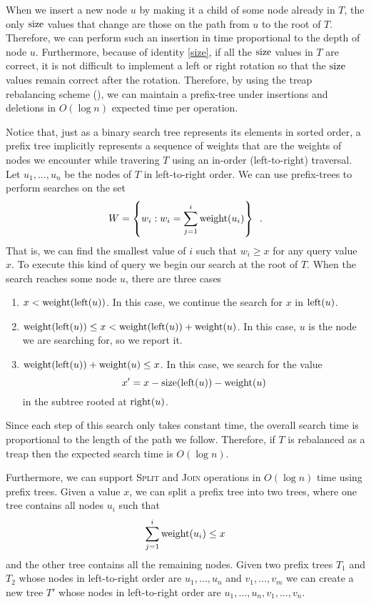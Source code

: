 When we insert a new node $u$ by making it a child of some node
already in $T$, the only $\mathrm{size}$ values that change are those on the
path from $u$ to the root of $T$.  Therefore, we can perform such an
insertion in time proportional to the depth of node $u$.  Furthermore,
because of identity \eqref{size}, if all the $\mathrm{size}$ values in $T$ are
correct, it is not difficult to implement a left or right rotation so
that the $\mathrm{size}$ values remain correct after the rotation.  Therefore, by
using the treap rebalancing scheme (), we can maintain
a prefix-tree under insertions and deletions in $O(\log n)$ expected
time per operation.

Notice that, just as a binary search tree represents its elements in
sorted order, a prefix tree implicitly represents a sequence of
weights that are the weights of nodes we encounter while travering $T$
using an in-order (left-to-right) traversal.  Let $u_1,\ldots,u_n$ be
the nodes of $T$ in left-to-right order.  We can use prefix-trees to
perform searches on the set 
\[
W = \left\{ w_i : w_i = \sum_{j=1}^i \mathrm{weight}(u_i) \right\} \enspace .
\]
That is, we can find the smallest value of $i$ such that $w_i\ge x$
for any query value $x$.  To execute this kind of query we begin our
search at the root of $T$.  When the search reaches some node $u$,
there are three cases

\begin{enumerate}
\item $x < \mathrm{weight}(\mathrm{left}(u))$.  In this case, we continue the search for $x$ in
  $\mathrm{left}(u)$.

\item $\mathrm{weight}(\mathrm{left}(u)) \le x < \mathrm{weight}(\mathrm{left}(u)) + \mathrm{weight}(u)$.  In this
  case, $u$ is the node we are searching for, so we report it.

\item $\mathrm{weight}(\mathrm{left}(u)) + \mathrm{weight}(u) \le x$.  In this case, we search
  for the value 
  \[ x'=x - \mathrm{size}(\mathrm{left}(u)) - \mathrm{weight}(u) \]
  in the subtree rooted at $\mathrm{right}(u)$.
\end{enumerate}

Since each step of this search only takes constant time, the overall
search time is proportional to the length of the path we follow.
Therefore, if $T$ is rebalanced as a treap then the expected search
time is $O(\log n)$.

Furthermore, we can support \textsc{Split} and \textsc{Join}
operations in $O(\log n)$ time using prefix trees.  Given a value $x$,
we can split a prefix tree into two trees, where one tree contains all nodes
$u_i$ such that
\[ \sum_{j=1}^i\mathrm{weight}(u_i) \le x
\]
 and the other tree contains all the remaining nodes.  Given two
prefix trees $T_1$ and $T_2$ whose nodes in left-to-right order are
$u_1,\ldots,u_n$ and $v_1,\ldots,v_m$ we can create a new tree $T'$
whose nodes in left-to-right order are
$u_1,\ldots,u_n,v_1,\ldots,v_n$.

